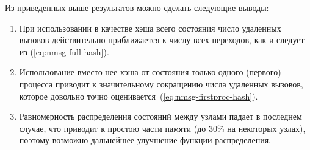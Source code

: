 
Из приведенных выше результатов можно сделать следующие выводы:

\begin{enumerate}
\item При использовании в качестве  хэша всего состояния число
  удаленных вызовов действительно приближается к числу всех переходов, как и
  следует из (\ref{eq:nmsg-full-hash}).

\item Использование вместо нее хэша от состояния только одного (первого)
  процесса приводит к значительному сокращению числа удаленных
  вызовов, которое довольно точно оценивается~(\ref{eq:nmsg-firstproc-hash}).

\item Равномерность распределения состояний между узлами падает в последнем
  случае, что приводит к простою части памяти  (до 30\% на некоторых узлах),
  поэтому возможно дальнейшее улучшение функции распределения.
\end{enumerate}





